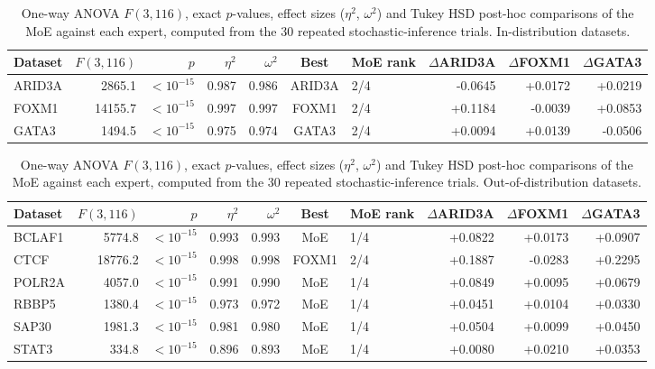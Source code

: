 \begin{table}[ht]
\centering
\caption{One-way ANOVA $F(3,116)$, exact $p$-values, effect sizes ($\eta^2$, $\omega^2$) and Tukey HSD post-hoc comparisons of the MoE against each expert, computed from the 30 repeated stochastic-inference trials. In-distribution datasets.}
\label{tab:optionA_indist}
\begin{tabular}{lrrrrclrrr}
\hline
Dataset & $F(3,116)$ & $p$ & $\eta^2$ & $\omega^2$ & Best & MoE rank & $\Delta$ARID3A & $\Delta$FOXM1 & $\Delta$GATA3 \\
\hline
ARID3A & 2865.1 & $<10^{-15}$ & 0.987 & 0.986 & ARID3A & 2/4 & -0.0645 & +0.0172 & +0.0219 \\
FOXM1 & 14155.7 & $<10^{-15}$ & 0.997 & 0.997 & FOXM1 & 2/4 & +0.1184 & -0.0039 & +0.0853 \\
GATA3 & 1494.5 & $<10^{-15}$ & 0.975 & 0.974 & GATA3 & 2/4 & +0.0094 & +0.0139 & -0.0506 \\
\hline
\end{tabular}
\end{table}

\begin{table}[ht]
\centering
\caption{One-way ANOVA $F(3,116)$, exact $p$-values, effect sizes ($\eta^2$, $\omega^2$) and Tukey HSD post-hoc comparisons of the MoE against each expert, computed from the 30 repeated stochastic-inference trials. Out-of-distribution datasets.}
\label{tab:optionA_ood}
\begin{tabular}{lrrrrclrrr}
\hline
Dataset & $F(3,116)$ & $p$ & $\eta^2$ & $\omega^2$ & Best & MoE rank & $\Delta$ARID3A & $\Delta$FOXM1 & $\Delta$GATA3 \\
\hline
BCLAF1 & 5774.8 & $<10^{-15}$ & 0.993 & 0.993 & MoE & 1/4 & +0.0822 & +0.0173 & +0.0907 \\
CTCF & 18776.2 & $<10^{-15}$ & 0.998 & 0.998 & FOXM1 & 2/4 & +0.1887 & -0.0283 & +0.2295 \\
POLR2A & 4057.0 & $<10^{-15}$ & 0.991 & 0.990 & MoE & 1/4 & +0.0849 & +0.0095 & +0.0679 \\
RBBP5 & 1380.4 & $<10^{-15}$ & 0.973 & 0.972 & MoE & 1/4 & +0.0451 & +0.0104 & +0.0330 \\
SAP30 & 1981.3 & $<10^{-15}$ & 0.981 & 0.980 & MoE & 1/4 & +0.0504 & +0.0099 & +0.0450 \\
STAT3 & 334.8 & $<10^{-15}$ & 0.896 & 0.893 & MoE & 1/4 & +0.0080 & +0.0210 & +0.0353 \\
\hline
\end{tabular}
\end{table}